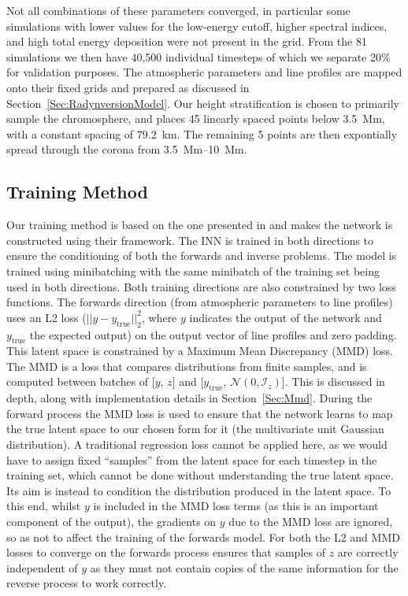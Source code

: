 Not all combinations of these parameters converged, in particular some simulations with lower values for the low-energy cutoff, higher spectral indices, and high total energy deposition were not present in the grid.
From the 81 simulations we then have 40,500 individual timesteps of which we separate 20\% for validation purposes.
The atmospheric parameters and line profiles are mapped onto their fixed grids and prepared as discussed in Section~\ref{Sec:RadynversionModel}.
Our height stratification is chosen to primarily sample the chromosphere, and places 45 linearly spaced points below \SI{3.5}{\mega\metre}, with a constant spacing of \SI{79.2}{\kilo\metre}.
The remaining 5 points are then expontially spread through the corona from \SIrange{3.5}{10}{\mega\metre}.

\subsection{Training Method}

Our training method is based on the one presented in \citet{2018Ardizzone} and makes the network is constructed using their framework. \NeedRef{}
The INN is trained in both directions to ensure the conditioning of both the forwards and inverse problems.
The model is trained using minibatching with the same minibatch of the training set being used in both directions.
Both training directions are also constrained by two loss functions.
The forwards direction (from atmospheric parameters to line profiles) uses an L2 loss ($||y-y_\mathrm{true}||_2^2$, where $y$ indicates the output of the network and $y_\mathrm{true}$ the expected output) on the output vector of line profiles and zero padding.
This latent space is constrained by a Maximum Mean Discrepancy (MMD) loss.
The MMD is a loss that compares distributions from finite samples, and is computed between batches of [$y$, $z$] and [$y_\mathrm{true}$, $\mathcal{N}(0, \mathcal{I}_z)$].
This is discussed in depth, along with implementation details in Section~\ref{Sec:Mmd}.
During the forward process the MMD loss is used to ensure that the network learns to map the true latent space to our chosen form for it (the multivariate unit Gaussian distribution).
A traditional regression loss cannot be applied here, as we would have to assign fixed ``samples'' from the latent space for each timestep in the training set, which cannot be done without understanding the true latent space.
Its aim is instead to condition the distribution produced in the latent space.
To this end, whilst $y$ is included in the MMD loss terms (as this is an important component of the output), the gradients on $y$ due to the MMD loss are ignored, so as not to affect the training of the forwards model.
For both the L2 and MMD losses to converge on the forwards process ensures that samples of $z$ are correctly independent of $y$ as they must not contain copies of the same information for the reverse process to work correctly.


